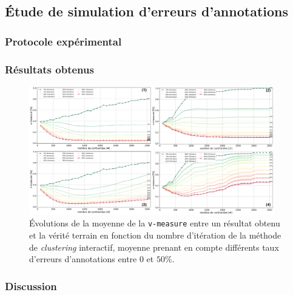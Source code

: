 	\subsection{Étude de simulation d'erreurs d'annotations}
	\label{section:4.6.1-ETUDE-ROBUSTESSE-SIMULATION-ERREURS-ANNOTATION}
	
		\subsubsection{Protocole expérimental}
		

		\subsubsection{Résultats obtenus}
		
			
			\begin{figure}[!htb]
				\centering
				\includegraphics[width=0.95\textwidth]{figures/etude-erreur-simulation-impact}
				\caption{Évolutions de la moyenne de la \texttt{v-measure} entre un résultat obtenu et la vérité terrain en fonction du nombre d'itération de la méthode de \textit{clustering} interactif, moyenne prenant en compte différents taux d'erreurs d'annotations entre $0$ et $50$\%.}
				\label{figure:4.6.1-ETUDE-ROBUSTESSE-SIMULATION-ERREURS-ANNOTATION}
			\end{figure}

		\subsubsection{Discussion}
		
